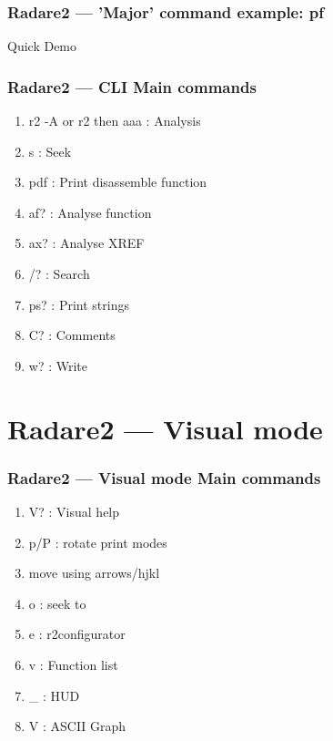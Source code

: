 \documentclass[10pt, compress]{beamer}
\begin{document}
\begin{frame}[fragile]
  \frametitle{Radare2 — 'Major' command example: pf}
  Quick Demo
\end{frame}

\begin{frame}[fragile]
  \frametitle{Radare2 — CLI Main commands}
  \begin{enumerate}
   \item r2 -A or r2 then aaa : Analysis
   \item s : Seek
   \item pdf : Print disassemble function
   \item af? : Analyse function
   \item ax? : Analyse XREF
   \item /? : Search
   \item ps? : Print strings
   \item C? : Comments
   \item w? : Write
 \end{enumerate}
\end{frame}

\section{Radare2 — Visual mode}
\begin{frame}[fragile]
  \frametitle{Radare2 — Visual mode Main commands}
  \begin{enumerate}
  \item V? : Visual help
  \item p/P : rotate print modes
  \item move using arrows/hjkl
  \item o : seek to
  \item e : r2configurator
  \item v : Function list
  \item \_ : HUD
  \item V : ASCII Graph
 \end{enumerate}
\end{frame}
\end{document}
